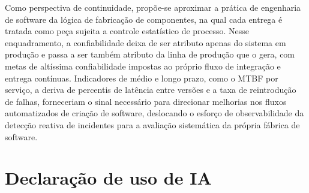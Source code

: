 \documentclass[12pt, a4paper, oneside]{article}
\begin{document}
Como perspectiva de continuidade, propõe-se aproximar a prática de engenharia de software da lógica de fabricação de componentes, na qual cada entrega é tratada como peça sujeita a controle estatístico de processo. Nesse enquadramento, a confiabilidade deixa de ser atributo apenas do sistema em produção e passa a ser também atributo da linha de produção que o gera, com metas de altíssima confiabilidade impostas ao próprio fluxo de integração e entrega contínuas. Indicadores de médio e longo prazo, como o MTBF por serviço, a deriva de percentis de latência entre versões e a taxa de reintrodução de falhas, forneceriam o sinal necessário para direcionar melhorias nos fluxos automatizados de criação de software, deslocando o esforço de observabilidade da detecção reativa de incidentes para a avaliação sistemática da própria fábrica de software.

\section{Declaração de uso de IA}


\end{document}
